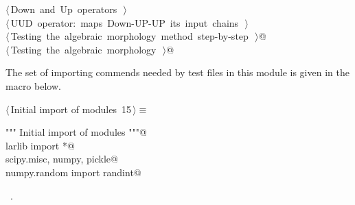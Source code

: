\documentclass[11pt,oneside]{article}	%
\begin{document}
\begin{flushleft}
\begin{list}{}{}
\mbox{}\verb@@\hbox{$\langle\,$Down and Up operators\nobreak\ {\footnotesize {}}$\,\rangle$}\verb@@\\
\mbox{}\verb@@\hbox{$\langle\,$UUD operator: maps Down-UP-UP its input chains\nobreak\ {\footnotesize {}}$\,\rangle$}\verb@@\\
\mbox{}\verb@@\hbox{$\langle\,$Testing the algebraic morphology method step-by-step\nobreak\ {\footnotesize {}}$\,\rangle$}\verb@ @\\
\mbox{}\verb@@\hbox{$\langle\,$Testing the algebraic morphology\nobreak\ {\footnotesize {}}$\,\rangle$}\verb@ @\\
\mbox{}\verb@@{\NWsep}
\end{list}
\vspace{-2ex}
\end{flushleft}

The set of importing commends needed by test files in this module is given in the macro below.

\begin{flushleft} \small
\begin{minipage}{\linewidth} \label{scrap27}
\protect{}$\langle\,$Initial import of modules\nobreak\ {\footnotesize 15}$\,\rangle\equiv$
\vspace{-1ex}
\begin{list}{}{} \item
\mbox{}\verb@""" Initial import of modules """@\\
\mbox{}\verb@from larlib import *@\\
\mbox{}\verb@import scipy.misc, numpy, pickle@\\
\mbox{}\verb@from numpy.random import randint@\\
\mbox{}\verb@@{\NWsep}
\end{list}
\vspace{-1ex}
\footnotesize\addtolength{\baselineskip}{-1ex}
\begin{list}{}{\setlength{\itemsep}{-\parsep}\setlength{\itemindent}{-\leftmargin}}
\item \NWtxtMacroRefIn\ .
\end{list}
\end{minipage}\\[4ex]
\end{flushleft}
\end{document}
